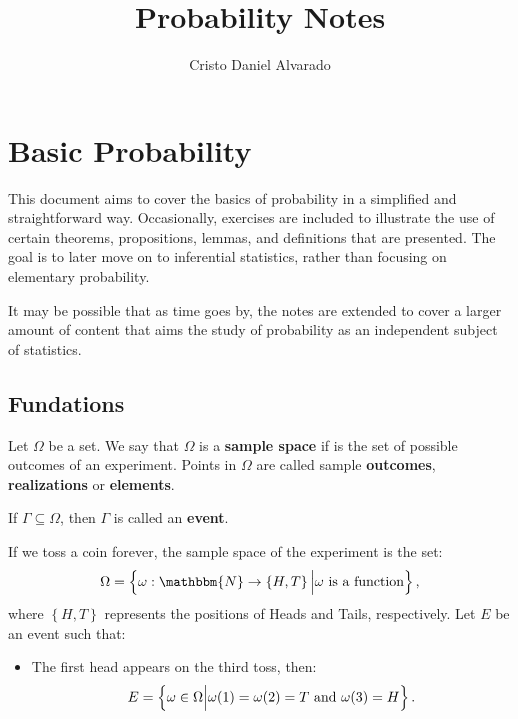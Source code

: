 \documentclass[12pt]{report}
\theoremstyle{largebreak}
\newcommand\cf[3]{\ensuremath{#1:#2\rightarrow#3}}
\newcommand{\bbm}[1]{\mathbbm{#1}}
\begin{document}
    \setlength{\parskip}{5pt}
    \setlength{\parindent}{12pt}
    \title{Probability Notes}
    \author{Cristo Daniel Alvarado}
    \maketitle

    \tableofcontents

    \newpage

    \chapter{Basic Probability}

    This document aims to cover the basics of probability in a simplified and straightforward way. Occasionally, exercises are included to illustrate the use of certain theorems, propositions, lemmas, and definitions that are presented. The goal is to later move on to inferential statistics, rather than focusing on elementary probability.

    It may be possible that as time goes by, the notes are extended to cover a larger amount of content that aims the study of probability as an independent subject of statistics.

    \section{Fundations}

    \begin{mydef}
        Let $\Omega$ be a set. We say that $\Omega$ is a \textbf{sample space} if is the set of possible outcomes of an experiment. Points in $\Omega$ are called sample \textbf{outcomes}, \textbf{realizations} or \textbf{elements}.

        If $\Gamma\subseteq\Omega$, then $\Gamma$ is called an \textbf{event}.
    \end{mydef}

    \begin{exa}
        If we toss a coin forever, the sample space of the experiment is the set:
        \begin{equation*}
            \Omega=\left\{\cf{\omega}{\bbm{N}}{\left\{H,T\right\}}\Big|\omega\textup{ is a function} \right\},
        \end{equation*}
        where $\left\{H,T\right\}$ represents the positions of Heads and Tails, respectively. Let $E$ be an event such that:
        \begin{itemize}
            \item The first head appears on the third toss, then:
            \begin{equation*}
                E=\left\{\omega\in\Omega\Big| \omega(1)=\omega(2)=T\textup{ and }\omega(3)=H\right\}.
            \end{equation*}
        \end{itemize}
    \end{exa}
\end{document}
